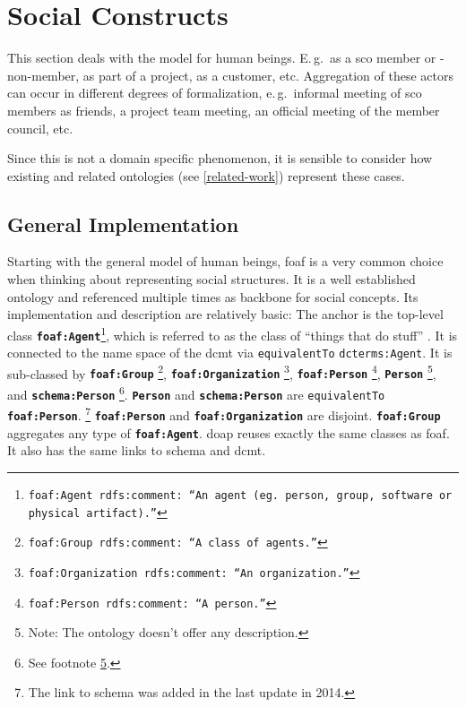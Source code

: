 \documentclass[a4paper, DIV=13, BCOR=0cm]{scrbook}
\newcommand{\eg}{e.\,g.\ }
\newcommand{\Eg}{E.\,g.\ }
\newcommand{\class}[1]{\texttt{\textbf{#1}}}
\newcommand{\relation}[1]{\texttt{#1}}
\newcommand{\foottt}[1]{\footnote{\texttt{#1}}}
\begin{document}
\section{Social Constructs}
This section deals with the model for human beings. \Eg as a \gls{sco} member or -non-member, as part of a project, as a customer, etc. Aggregation of these actors can occur in different degrees of formalization, \eg informal meeting of \gls{sco} members as friends, a project team meeting, an official meeting of the member council, etc. 

Since this is not a domain specific phenomenon, it is sensible to consider how existing and related ontologies (see \autoref{related-work}) represent these cases.

\subsection{General Implementation}
\label{general-implementation}
Starting with the general model of human beings, \gls{foaf} is a very common choice when thinking about representing social structures. It is a well established ontology and referenced multiple times as backbone for social concepts. Its implementation and description are relatively basic: The anchor is the top-level class \class{foaf:Agent}\foottt{foaf:Agent rdfs:comment: \enquote{An agent (eg. person, group, software or physical artifact).}}, which is referred to as the class of \enquote{things that do stuff} \cite[http://xmlns.com/foaf/spec/\#term\_Agent]{Dan-Brickley2014FOAF-Vocabulary}. It is connected to the name space of the \gls{dcmt} via \relation{equivalentTo} \relation{dcterms:Agent}. It is sub-classed by
%
\class{foaf:Group}%
	\foottt{foaf:Group rdfs:comment: \enquote{A class of agents.}},
%
\class{foaf:Organization}%
	\foottt{foaf:Organization rdfs:comment: \enquote{An organization.}},
%
\class{foaf:Person}%
	\foottt{foaf:Person rdfs:comment: \enquote{A person.}},
%
\class{Person}%
	\footnote{\label{footn:no-desc}Note: The ontology doesn't offer any description.}, and
\class{schema:Person}%
	\footnote{See footnote \ref{footn:no-desc}.}.
\class{Person} and \class{schema:Person} are \relation{equivalentTo} \class{foaf:Person}.%
	\footnote{The link to \gls{schema} was added in the last update in 2014.} \class{foaf:Person} and \class{foaf:Organization} are disjoint. \class{foaf:Group} aggregates any type of \class{foaf:Agent}. \gls{doap} reuses exactly the same classes as \gls{foaf}. It also has the same links to \gls{schema} and \gls{dcmt}.
\end{document}
